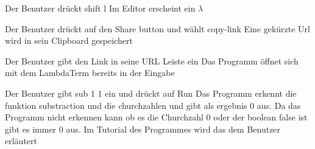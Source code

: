 \documentclass[parskip=full,11pt,twoside]{scrartcl}
\begin{document}
{ Der Benutzer drückt shift l }
{Im Editor erscheint ein $\lambda$}

{ Der Benutzer drückt auf den Share button und wählt copy-link}
{ Eine gekürzte Url wird in sein Clipboard gespeichert }

{Der Benutzer gibt den Link in seine URL Leiste ein }
{ Das Programm öffnet sich mit dem LambdaTerm bereits in der Eingabe }

{ Der Benutzer gibt sub 1 1 ein und drückt auf Run }
{ Das Programm erkennt die funktion substraction und die churchzahlen und gibt als ergebnis 0 aus. Da das Programm nicht erkennen kann ob es die Churchzahl 0 oder der boolean false ist gibt es immer 0 aus. Im Tutorial des Programmes wird das dem Benutzer erläutert }





\end{document}
